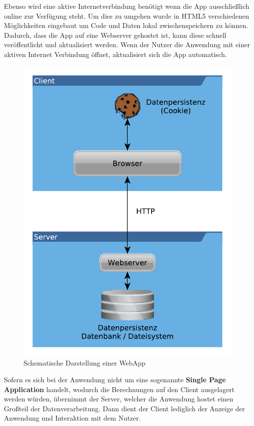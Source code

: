 Ebenso wird eine aktive Internetverbindung benötigt wenn die App ausschließlich online zur Verfügung steht. Um dies zu umgehen wurde in HTML5 verschiedenen Möglichkeiten eingebaut um Code und Daten lokal zwischenspeichern zu können. Dadurch, dass die App auf eine Webserver gehostet ist, kann diese schnell veröffentlicht und aktualisiert werden. Wenn der Nutzer die Anwendung mit einer aktiven Internet Verbindung öffnet, aktualisiert sich die App automatisch. 

\begin{figure}[H]
	\centering
	\includegraphics[scale=0.8]{images/Webapps}
	\caption[Schematische Darstellung einer WebApp]{Schematische Darstellung einer WebApp}
	\label{Webapps}
\end{figure}

Sofern es sich bei der Anwendung nicht um eine sogenannte \textbf{Single Page Application} handelt, wodurch die Berechnungen auf den Client ausgelagert werden würden, übernimmt der Server, welcher die Anwendung hostet einen Großteil der Datenverarbeitung. Dann dient der Client lediglich der Anzeige der Anwendung und Interaktion mit dem Nutzer.

